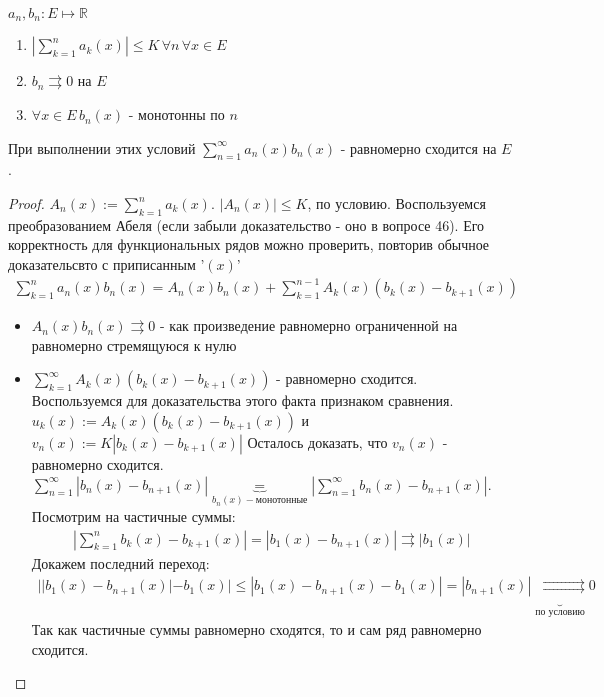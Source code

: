 
\begin{theorem} \thmslashn
  
  $a_n, b_n : E\mapsto \mathbb{R}$
  \begin{enumerate}
  \item
    $|\sum\limits_{k = 1}^{n}{a_k(x)}| \leqslant K\, \forall n\, \forall x \in E$
  \item
    $b_n \rightrightarrows 0$ на $E$
  \item
    $\forall x \in E \, b_n(x)$ - монотонны по $n$
  \end{enumerate}
  При выполнении этих условий $\sum\limits_{n = 1}^{\infty}{a_n(x)b_n(x)}$ - равномерно сходится на $E$.

  \begin{proof} \thmslashn
    
    $A_n(x) := \sum\limits_{k = 1}^{n}{a_k(x)}$. $\left|A_n(x)\right|\leqslant K$, по условию. Воспользуемся преобразованием Абеля (если забыли доказательство - оно в вопросе 46). Его корректность для функциональных рядов можно проверить, повторив обычное доказательсвто с приписанным '$(x)$'
    \[\begin{aligned}
      \sum\limits_{k = 1}^{n}{a_n(x)b_n(x)} = A_n(x)b_n(x) + \sum\limits_{k = 1}^{n-1}{A_k(x)(b_k(x) - b_{k+1}(x))}
    \end{aligned}\]
    \begin{itemize}
    \item
      $A_n(x)b_n(x) \rightrightarrows 0$ - как произведение равномерно ограниченной на равномерно стремящуюся к нулю
    \item
      $\sum\limits_{k = 1}^{\infty}{A_k(x)(b_k(x) - b_{k+1}(x))}$ - равномерно сходится. Воспользуемся для доказательства этого факта признаком сравнения. \\
      $u_k(x) := A_k(x)(b_k(x) - b_{k+1}(x))$ и $v_n(x) := K|b_k(x) - b_{k+1}(x)|$
      Осталось доказать, что $v_n(x)$ - равномерно сходится.
      $\sum\limits_{n = 1}^{\infty}{|b_n(x) - b_{n+1}(x)|} \underbrace{=}_{b_n(x) - \text{монотонные}} \left|\sum\limits_{n=1}^{\infty}{b_n(x)-b_{n+1}(x)}\right|$.
      Посмотрим на частичные суммы:
        \[\begin{aligned}
          \left|\sum\limits_{k = 1}^{n}{b_k(x) - b_{k+1}(x)}\right| = |b_1(x) - b_{n+1}(x)| \rightrightarrows |b_1(x)|
        \end{aligned}\]
      Докажем последний переход:
      \[\begin{aligned}
        ||b_1(x) - b_{n+1}(x)| - b_1(x)| \leqslant |b_1(x) - b_{n+1}(x) - b_1(x)| = |b_{n+1}(x)| \underbrace{\rightrightarrows}_{\text{по условию}} 0
      \end{aligned}\]
      Так как частичные суммы равномерно сходятся, то и сам ряд равномерно сходится.
    \end{itemize}
  \end{proof}    
\end{theorem}


